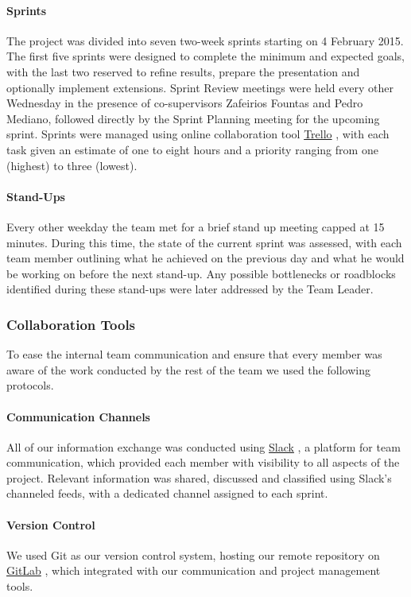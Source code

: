 \documentclass[a4paper,11pt]{article}
\begin{document}
\paragraph{Sprints}
The project was divided into seven two-week sprints starting on 4 February 2015. The first five sprints were designed to complete the minimum and expected goals, with the last two reserved to refine results, prepare the presentation and optionally implement extensions. Sprint Review meetings were held every other Wednesday in the presence of co-supervisors Zafeirios Fountas and Pedro Mediano, followed directly by the Sprint Planning meeting for the upcoming sprint. Sprints were managed using online collaboration tool \href{http://trello.com}{Trello} \cite{trello}, with each task given an estimate of one to eight hours and a priority ranging from one (highest) to three (lowest).

\paragraph{Stand-Ups}
Every other weekday the team met for a brief stand up meeting capped at 15 minutes. During this time, the state of the current sprint was assessed, with each team member outlining what he achieved on the previous day and what he would be working on before the next stand-up. Any possible bottlenecks or roadblocks identified during these stand-ups were later addressed by the Team Leader.

\subsubsection{Collaboration Tools}
To ease the internal team communication and ensure that every member was aware of the work conducted by the rest of the team we used the following protocols.

\paragraph{Communication Channels}
All of our information exchange was conducted using \href{http://slack.com}{Slack} \cite{slack}, a platform for team communication, which provided each member with visibility to all aspects of the project. Relevant information was shared, discussed and classified using Slack's channeled feeds, with a dedicated channel assigned to each sprint.

\paragraph{Version Control}
We used Git as our version control system, hosting our remote repository on \href{http://gitlab.com}{GitLab} \cite{gitlab}, which integrated with our communication and project management tools.
\end{document}
